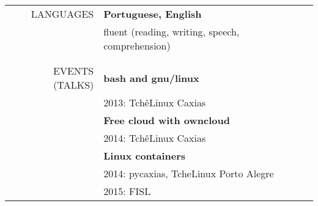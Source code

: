 \begin{tabular}{rp{12cm}}
    \uppercase{Languages}
    & \textbf{Portuguese, English} \\
    & fluent (reading, writing, speech, comprehension)
    \\\\ \hline \\
    \uppercase{Events (talks)}
    & \textbf{bash and gnu/linux} \\
    & 2013: TchêLinux Caxias \\
    & \textbf{Free cloud with owncloud} \\
    & 2014: TchêLinux Caxias \\
    & \textbf{Linux containers} \\
    & 2014: pycaxias, TcheLinux Porto Alegre \\
    & 2015: FISL
\end{tabular}
